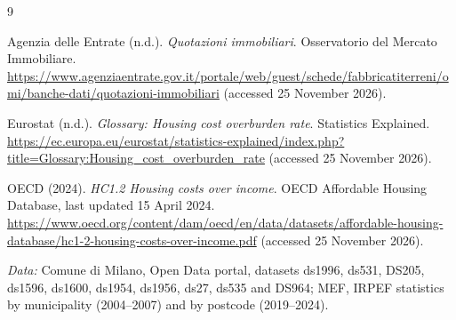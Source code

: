 \begin{thebibliography}{9}

Agenzia delle Entrate (n.d.).
\newblock \emph{Quotazioni immobiliari}. Osservatorio del Mercato Immobiliare.
\newblock \url{https://www.agenziaentrate.gov.it/portale/web/guest/schede/fabbricatiterreni/omi/banche-dati/quotazioni-immobiliari}
(accessed 25 November 2026).

Eurostat (n.d.).
\newblock \emph{Glossary: Housing cost overburden rate}. Statistics Explained.
\newblock \url{https://ec.europa.eu/eurostat/statistics-explained/index.php?title=Glossary:Housing_cost_overburden_rate}
(accessed 25 November 2026).

OECD (2024).
\newblock \emph{HC1.2 Housing costs over income}. OECD Affordable Housing
Database, last updated 15 April 2024.
\newblock \url{https://www.oecd.org/content/dam/oecd/en/data/datasets/affordable-housing-database/hc1-2-housing-costs-over-income.pdf}
(accessed 25 November 2026).

\end{thebibliography}

\noindent\emph{Data:} Comune di Milano, Open Data portal, datasets ds1996,
ds531, DS205, ds1596, ds1600, ds1954, ds1956, ds27, ds535 and DS964; MEF,
IRPEF statistics by municipality (2004--2007) and by postcode (2019--2024).

